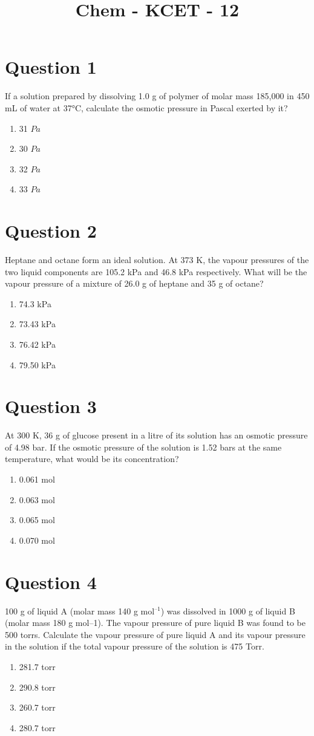 \documentclass{article}
\title{Chem - KCET - 12}
\begin{document}
                    \maketitle
                    \section*{Question 1}
If a solution prepared by dissolving 1.0 g of polymer of molar mass 185,000 in 450 mL of water at 37°C, calculate the osmotic pressure in Pascal exerted by it?
\begin{enumerate}[label=(\alph*)]
\item 31 \(Pa\)
\item 30 \(Pa\)
\item 32 \(Pa\)
\item 33 \(Pa\)
\end{enumerate}
\newpage
\section*{Question 2}
Heptane and octane form an ideal solution. At 373 K, the vapour pressures of the two liquid components are 105.2 kPa and 46.8 kPa respectively. What will be the vapour pressure of a mixture of 26.0 g of heptane and 35 g of octane?
\begin{enumerate}[label=(\alph*)]
\item 74.3 kPa
\item 73.43 kPa
\item 76.42 kPa
\item 79.50 kPa
\end{enumerate}
\newpage
\section*{Question 3}
At 300 K, 36 g of glucose present in a litre of its solution has an osmotic pressure of 4.98 bar. If the osmotic pressure of the solution is 1.52 bars at the same temperature, what would be its concentration?
\begin{enumerate}[label=(\alph*)]
\item 0.061 mol
\item 0.063 mol
\item 0.065 mol
\item 0.070 mol
\end{enumerate}
\newpage
\section*{Question 4}
100 g of liquid A (molar mass 140 g mol$^{–1}$) was dissolved in 1000 g of liquid B (molar mass 180 g mol–1). The vapour pressure of pure liquid B was found to be 500 torrs. Calculate the vapour pressure of pure liquid A and its vapour pressure in the solution if the total vapour pressure of the solution is 475 Torr.
\begin{enumerate}[label=(\alph*)]
\item 281.7 torr
\item 290.8 torr
\item 260.7 torr
\item 280.7 torr
\end{enumerate}
\newpage
\end{document}
